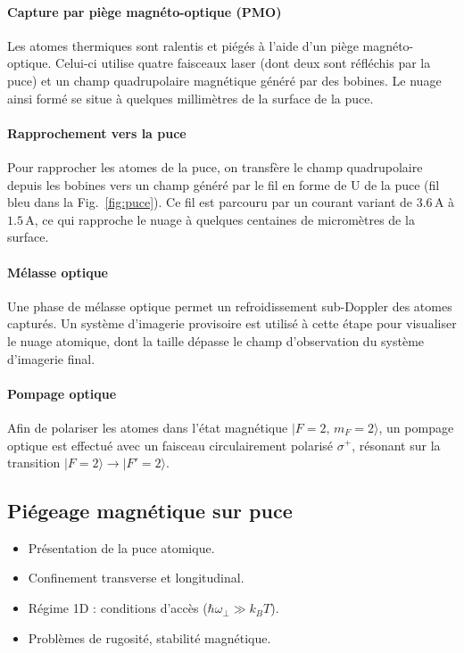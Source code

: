 \paragraph{Capture par piège magnéto-optique (PMO)}
Les atomes thermiques sont ralentis et piégés à l’aide d’un piège magnéto-optique. Celui-ci utilise quatre faisceaux laser (dont deux sont réfléchis par la puce) et un champ quadrupolaire magnétique généré par des bobines. Le nuage ainsi formé se situe à quelques millimètres de la surface de la puce.

\paragraph{Rapprochement vers la puce}
Pour rapprocher les atomes de la puce, on transfère le champ quadrupolaire depuis les bobines vers un champ généré par le fil en forme de U de la puce (fil bleu dans la Fig.~\ref{fig:puce}). Ce fil est parcouru par un courant variant de \( 3.6\,\mathrm{A} \) à \( 1.5\,\mathrm{A} \), ce qui rapproche le nuage à quelques centaines de micromètres de la surface.

\paragraph{Mélasse optique}
Une phase de mélasse optique permet un refroidissement sub-Doppler des atomes capturés. Un système d’imagerie provisoire est utilisé à cette étape pour visualiser le nuage atomique, dont la taille dépasse le champ d’observation du système d’imagerie final.

\paragraph{Pompage optique}
Afin de polariser les atomes dans l’état magnétique \( |F=2,\,m_F=2\rangle \), un pompage optique est effectué avec un faisceau circulairement polarisé \( \sigma^+ \), résonant sur la transition \( |F=2\rangle \rightarrow |F'=2\rangle \).


\subsection{Piégeage magnétique sur puce}
{\color{blue}
\begin{itemize}
    \item Présentation de la puce atomique.
    \item Confinement transverse et longitudinal.
    \item Régime 1D : conditions d’accès (\(\hbar \omega_\perp \gg k_B T\)).
    \item Problèmes de rugosité, stabilité magnétique.
\end{itemize}
}

